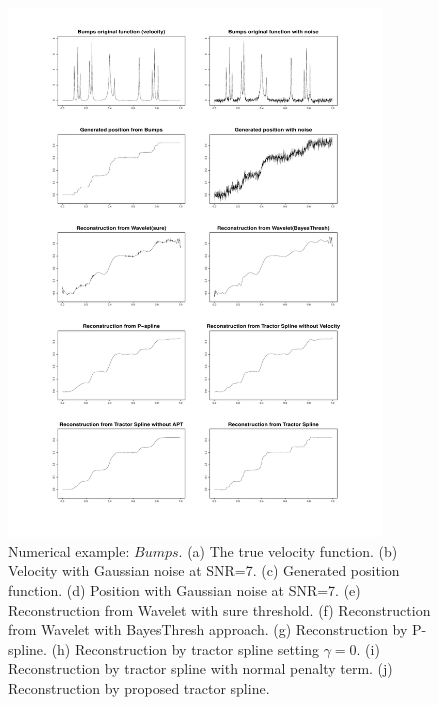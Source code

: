 \begin{figure}
  \centering
    \includegraphics[width=\textwidth,height=14cm]{Chapters/2.TractorSplineTheory/plot/bumps10}
  \caption{Numerical example: $\textit{Bumps}$. (a) The true velocity function. (b) Velocity with Gaussian noise at SNR=7. (c) Generated position function. (d) Position with Gaussian noise at SNR=7. (e) Reconstruction from Wavelet with sure threshold. (f) Reconstruction from Wavelet with BayesThresh approach. (g) Reconstruction by P-spline. (h) Reconstruction by tractor spline setting $\gamma=0$. (i) Reconstruction by tractor spline with normal penalty term. (j) Reconstruction by proposed tractor spline.}\label{num2}
\end{figure}

